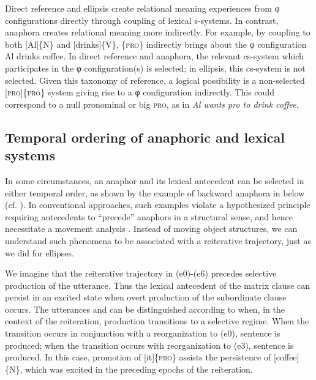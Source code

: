 Direct reference and ellipsis create relational meaning experiences from φ configurations directly through coupling of lexical s-systems. In contrast, anaphora creates relational meaning more indirectly. For example, by coupling to both [Al]\{N\} and [drinks]\{V\}, \{\textsc{pro}\} indirectly brings about the φ configuration {\textbar}Al drinks coffee{\textbar}. In direct reference and anaphora, the relevant cs-system which participates in the φ configuration(s) is selected; in ellipsis, this cs-system is not selected. Given this taxonomy of reference, a logical possibility is a non-selected [\textsc{pro}]\{\textsc{pro}\} system giving rise to a φ configuration indirectly. This could correspond to a null pronominal or big \textsc{pro}, as in \textit{Al wants pro to drink coffee}.

\subsection{Temporal ordering of anaphoric and lexical systems}

In some circumstances, an anaphor and its lexical antecedent can be selected in either temporal order, as shown by the example of backward anaphora in  below (cf. \citealt{KazaninaEtAl2007,ReulandAvrutin2005}). In conventional approaches, such examples violate a hypothesized principle requiring antecedents to “precede” anaphors in a structural sense, and hence necessitate a movement analysis \citep{Chomsky1993}. Instead of moving object structures, we can understand such phenomena to be associated with a reiterative trajectory, just as we did for ellipses.

  We imagine that the reiterative trajectory in (e0)-(e6) precedes selective production of the utterance. Thus the lexical antecedent of the matrix clause can persist in an excited state when overt production of the subordinate clause occurs. The utterances  and  can be distinguished according to when, in the context of the reiteration, production transitions to a selective regime. When the transition occurs in conjunction with a reorganization to (e0), sentence  is produced; when the transition occurs with reorganization to (e3), sentence  is produced. In this case, promotion of [it]\{\textsc{pro}\} assists the persistence of [coffee]\{N\}, which was excited in the preceding epochs of the reiteration.

\ea\label{ex:7:1}
\z
\z
  
